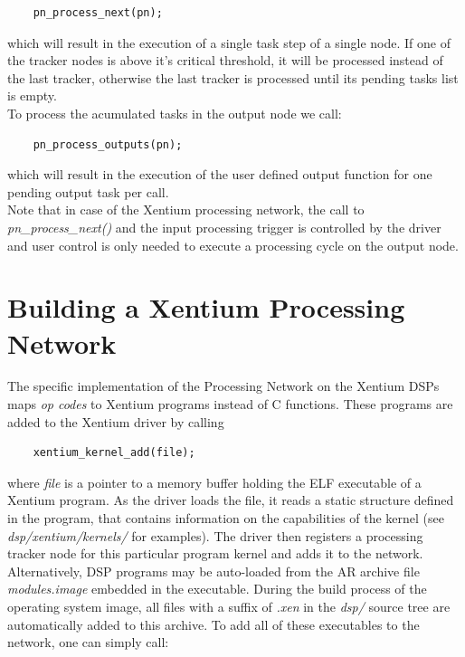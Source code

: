\begin{lstlisting}
	pn_process_next(pn);
\end{lstlisting}

\noindent
which will result in the execution of a single task step of a single node.
If one of the tracker nodes is above it's critical threshold, it will be
processed instead of the last tracker, otherwise the last tracker is processed
until its pending tasks list is empty.
\\

\noindent
To process the acumulated tasks in the output node we call:

\begin{lstlisting}
	pn_process_outputs(pn);
\end{lstlisting}

\noindent
which will result in the execution of the user defined output function for
one pending output task per call.
\\

\noindent
Note that in case of the Xentium processing network, the call to
\emph{pn\_process\_next()} and the input processing trigger is controlled by
the driver and user control is only needed to execute a processing cycle on the
output node.

\section{Building a Xentium Processing Network}


The specific implementation of the Processing Network on the Xentium DSPs maps
\emph{op codes} to Xentium programs instead of C functions. These programs
are added to the Xentium driver by calling

\begin{lstlisting}
	xentium_kernel_add(file);
\end{lstlisting}

\noindent
where \emph{file} is a pointer to a memory buffer holding the ELF executable
of a Xentium program. As the driver loads the file, it reads a static structure
defined in the program, that contains information on the capabilities of the
kernel (see \emph{dsp/xentium/kernels/} for examples). The driver then registers
a processing tracker node for this particular program kernel and adds it to the
network. Alternatively, DSP programs may be auto-loaded from the AR archive
file \emph{modules.image} embedded in the executable. During the build process
of the operating system image, all files with a suffix of \emph{.xen} in the
\emph{dsp/} source tree are automatically added to this archive. To add all
of these executables to the network, one can simply call:

